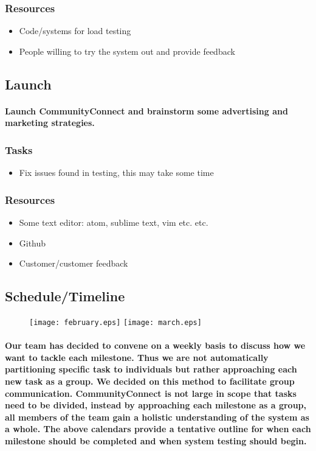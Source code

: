 \documentclass[12pt]{article}
\begin{document}
	  	\subsubsection{\bf Resources}
				\begin{itemize}
 					\item Code/systems for load testing
			 		\item	People willing to try the system out and provide feedback
				\end{itemize}

		\subsection{\bf Launch}
			\paragraph{ Launch CommunityConnect and brainstorm some advertising and marketing strategies.}
			\subsubsection{\bf Tasks}
				\begin{itemize}
					\item	Fix issues found in testing, this may take some time
				\end{itemize}
	  	\subsubsection{\bf Resources}
				\begin{itemize}
				 	 \item Some text editor: atom, sublime text, vim etc. etc.
			 		\item Github
 					\item Customer/customer feedback
				\end{itemize}

	\subsection{\bf Schedule/Timeline}
	
	 	\begin{figure}[h]
                	\texttt{[image: february.eps]}
                	\texttt{[image: march.eps]}
         	\end{figure}
\clearpage

		\paragraph{\normalfont \indent Our team has decided to convene on a weekly basis to discuss how we want to tackle each milestone. Thus we are not automatically partitioning specific task to individuals but rather approaching each new task as a group. We decided on this method to facilitate group communication. CommunityConnect is not large in scope that tasks need to be divided, instead by approaching each milestone as a group, all members of the team gain a holistic understanding of the system as a whole. The above calendars provide a tentative outline for when each milestone should be completed and when system testing should begin.
    }
\end{document}
